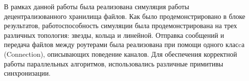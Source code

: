 В рамках данной работы была реализована симуляция работы децентрализованного хранилища файлов. Как было продемонстрировано в блоке результатов, работоспособность симуляции была продемонстрирована на трех различных топология: звезды, кольца и линейной. Отправка сообщений и передача файлов между роутерами была реализована при помощи одного класcа (Connection), описывающих поведение каналов. Для обеспечения корректной работы параллельных алгоритмов, использовались различные примитивы синхронизации.